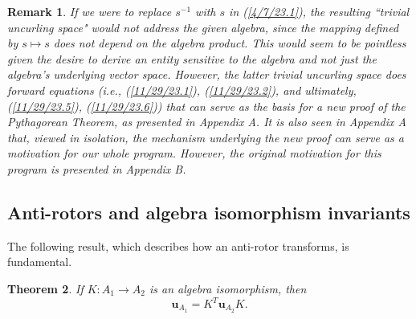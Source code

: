 \documentclass{amsart}
\numberwithin{equation}{section}
\newtheorem{theorem}{Theorem}
\newtheorem{remark}[theorem]{Remark}
\theoremstyle{definition}
\numberwithin{theorem}{section}
\begin{document}
\begin{remark}\label{11/21/23.1} {\rm If we were to replace $s^{-1}$ with $s$ in (\ref{4/7/23.1}), the resulting ``trivial uncurling space" would not address the given algebra, since the mapping defined by $s\mapsto s$ does not depend on the algebra product.  This would seem to be pointless given the desire to derive an entity sensitive to the algebra and not just the algebra's underlying vector space.  However, the latter trivial uncurling space does forward equations (i.e., (\ref{11/29/23.1}), (\ref{11/29/23.2}), and ultimately, (\ref{11/29/23.5}), (\ref{11/29/23.6})) that can serve as the basis for a new proof of the Pythagorean Theorem, as presented in Appendix A.  It is also seen in Appendix A that, viewed in isolation, the mechanism underlying the new proof can serve as a motivation for our whole program.  However, the original motivation for this program is presented in Appendix B.  }\end{remark}

\subsection{Anti-rotors and algebra isomorphism invariants} The following result, which describes how an anti-rotor transforms, is fundamental.


\begin{theorem} \label{6/6/23.1} If $K:A_1\rightarrow A_2$ is an algebra isomorphism, then \begin{equation}\label{5/23/23.1} \mathbf{u}_{A_1} = K^T \mathbf{u}_{A_2} K. \end{equation} \end{theorem}
\end{document}
